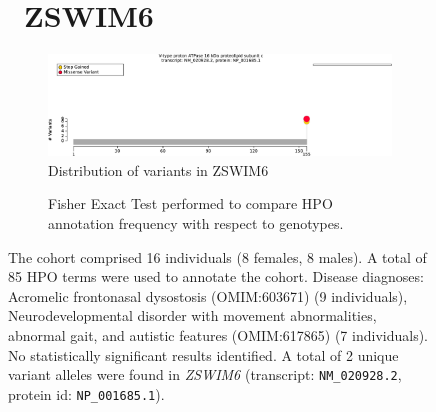 \begin{figure}[htbp]
\section*{ ZSWIM6}
\centering
\begin{subfigure}[b]{0.95\textwidth}
\centering
\includegraphics[width=\textwidth]{ img/ZSWIM6_protein_diagram.pdf} 
\captionsetup{justification=raggedright,singlelinecheck=false}
\caption{Distribution of variants in ZSWIM6}
\end{subfigure}

\vspace{2em}

\begin{subfigure}[b]{0.95\textwidth}
\centering
{}
\captionsetup{justification=raggedright,singlelinecheck=false}
\caption{Fisher Exact Test performed to compare HPO annotation frequency with respect to genotypes.}
\end{subfigure}

\vspace{2em}

\caption{The cohort comprised 16 individuals (8 females, 8 males). A total of 85 HPO terms were used to annotate the cohort. 
Disease diagnoses: Acromelic frontonasal dysostosis (OMIM:603671) (9 individuals), 
Neurodevelopmental disorder with movement abnormalities, abnormal gait, and autistic features (OMIM:617865) (7 individuals). 
No statistically significant results identified. A total of 2 unique variant alleles were found in \textit{ZSWIM6} 
(transcript: \texttt{NM\_020928.2}, protein id: \texttt{NP\_001685.1}).}
\end{figure}
